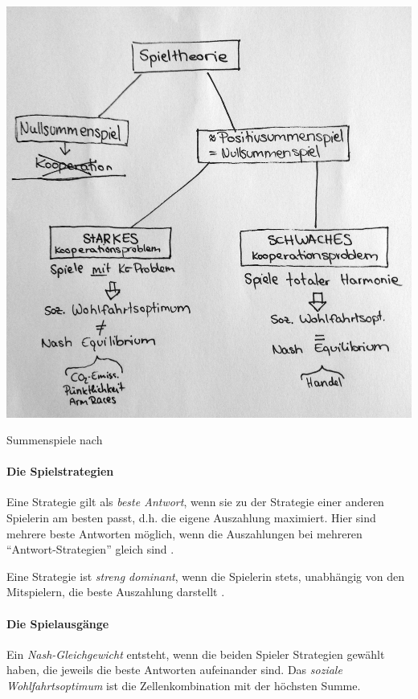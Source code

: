 \begin{dsafigure}
	\begin{center}
	\includegraphics[width=0.9\columnwidth]{img/summenspiele.jpg}
	\caption{Summenspiele nach \cite{Kleinberg-2009-oz}}
	\label{fig:gefangenendilemma}
	\end{center}
\end{dsafigure}


\paragraph{Die Spielstrategien}

Eine Strategie gilt als \emph{beste Antwort}, wenn sie zu der Strategie einer anderen Spielerin am besten passt, d.h. die eigene Auszahlung maximiert.
Hier sind mehrere beste Antworten möglich, wenn die Auszahlungen bei mehreren ``Antwort-Strategien'' gleich sind \parencite[153]{Kleinberg-2009-oz}.

Eine Strategie ist \emph{streng dominant}, wenn die Spielerin stets, unabhängig von den Mitspielern, die beste Auszahlung darstellt \parencite[vgl.][164]{Kleinberg-2009-oz}.


\paragraph{Die Spielausgänge}

Ein \emph{Nash-Gleichgewicht} entsteht, wenn die beiden Spieler Strategien gewählt haben, die jeweils die beste Antworten aufeinander sind.
Das \emph{soziale Wohlfahrtsoptimum} ist die Zellenkombination mit der höchsten Summe.

